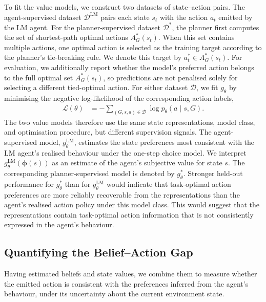 \documentclass{article}
\begin{document}
To fit the value models, we construct two datasets of state--action pairs.
The agent-supervised dataset $\mathcal D^{\mathrm{LM}}$ pairs each state
$s_t$ with the action $a_t$ emitted by the LM agent. For the
planner-supervised dataset $\mathcal D^{*}$, the planner first computes the
set of shortest-path optimal actions $A_G^{*}(s_t)$. When this set contains
multiple actions, one optimal action is selected as the training target
according to the planner's tie-breaking rule. We denote this target by
$a_t^{*}\in A_G^{*}(s_t)$. For evaluation, we additionally report whether the model's preferred action
belongs to the full optimal set $A_G^{*}(s_t)$, so predictions are not
penalised solely for selecting a different tied-optimal action. 
For either dataset $\mathcal D$, we fit $g_\theta$ by minimising the negative log-likelihood of the corresponding action labels,\begin{align}
    \mathcal L(\theta)
    &=
    -\sum_{(G,s,a)\in\mathcal D}
    \log p_\theta(a\mid s,G).
    \label{eq:irl-objective}
\end{align}
The two value models therefore use the same state representations, model class, and optimisation procedure, but different supervision signals.
The agent-supervised model, $g_\theta^{\mathrm{LM}}$, estimates the state preferences most consistent with the LM agent's realised behaviour under the one-step choice model.
We interpret $g_\theta^{\mathrm{LM}}(\boldsymbol{\phi}(s))$ as an estimate of the agent's subjective value for state $s$.
The corresponding planner-supervised model is denoted by $g_\theta^{*}$.
Stronger held-out performance for $g_\theta^{*}$ than for $g_\theta^{\mathrm{LM}}$ would indicate that task-optimal action preferences are more reliably recoverable from the representations than the agent's realised action policy under this model class.
This would suggest that the representations contain task-optimal action information that is not consistently expressed in the agent's behaviour.

\subsection{Quantifying the Belief--Action Gap}
\label{sec:belief-action-gap}

Having estimated beliefs and state values, we combine them to measure whether the emitted action is consistent with the preferences inferred from the agent's behaviour, under its uncertainty about the current environment state.
\end{document}
